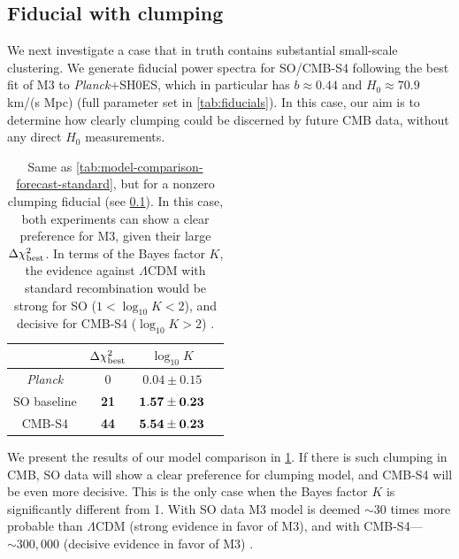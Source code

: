 \subsection{Fiducial with clumping}
\label{sec:forecasts-clumping}

We next investigate a case that in truth contains substantial small-scale clustering.
We generate fiducial power spectra for SO/CMB-S4 following the best fit of M3 to {\it Planck}+SH0ES, which in particular has $b\approx 0.44$ and $H_0\approx 70.9$ km/(s Mpc) (full parameter set in \cref{tab:fiducials}).
In this case, our aim is to determine how clearly clumping could be discerned by future CMB data, without any direct $H_0$ measurements.

\begin{table}[ht!]
\centering
\begin{tabular}{|c|c|c|c|}
\hline
 & $\Delta \chi^2_{\rm best}$ & $\log_{10} K$ \\
\hline
{\it Planck} & 0 & $0.04\pm 0.15$ \\
\hline
SO baseline & {\bf 21} & ${\bf 1.57\pm 0.23}$ \\
CMB-S4 & {\bf 44} & ${\bf 5.54\pm 0.23}$ \\
\hline
\end{tabular}
\caption[Clumping vs standard model comparison forecast with a clumpy recombination fiducial]{Same as \cref{tab:model-comparison-forecast-standard}, but for a nonzero clumping fiducial (see \cref{sec:forecasts-clumping}).
In this case, both experiments can show a clear preference for M3, given their large $\Delta \chi^2_{\rm best}$.
In terms of the Bayes factor $K$, the evidence against $\Lambda$CDM with standard recombination would be strong for SO ($1<\log_{10}K<2$), and decisive for CMB-S4 ($\log_{10}K>2$) \citep{bayes-factors}.
}
\label{tab:model-comparison-forecast-clumping}
\end{table}

We present the results of our model comparison in \cref{tab:model-comparison-forecast-clumping}.
If there is such clumping in CMB, SO data will show a clear preference for clumping model, and CMB-S4 will be even more decisive.
This is the only case when the Bayes factor $K$ is significantly different from 1.
With SO data M3 model is deemed $\sim 30$ times more probable than $\Lambda$CDM (strong evidence in favor of M3), and with CMB-S4---$\sim 300,000$ (decisive evidence in favor of M3) \citep{bayes-factors}.

